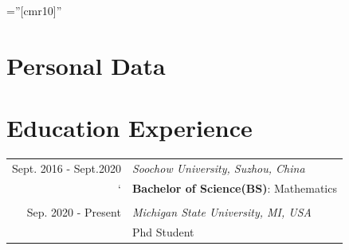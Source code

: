 \documentclass[a4paper,10pt,utf8]{article} %
\begin{document}
\pagestyle{empty} %
\font\fb=''[cmr10]'' %

\par{\bigskip\par} %

\section{Personal Data}
\begin{table}[ht]
\end{table}


\section{Education Experience}

\begin{tabular}{r|p{11cm}}	
Sept. 2016 - Sept.2020 					& \textit{Soochow University, Suzhou, China}\\
				`					& \textbf{Bachelor of Science(BS)}: Mathematics\\


\multicolumn{2}{c}{} \\	%
Sep. 2020 - Present			&\textit{Michigan State University, MI, USA}\\
								& Phd Student   							
\end{tabular}
\end{document}
